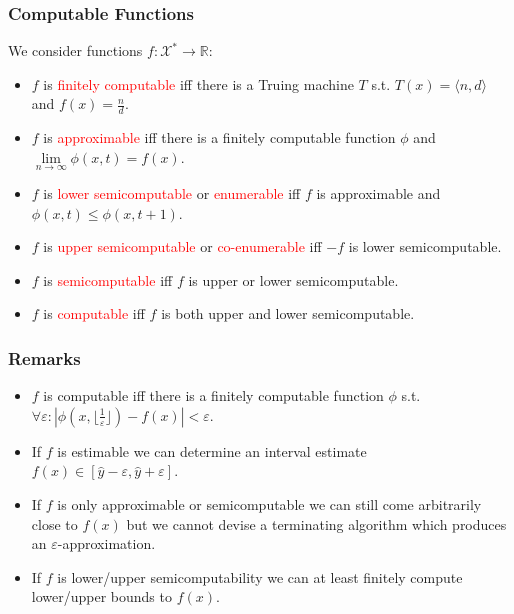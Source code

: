 \documentclass[UTF8,11pt,colorlinks,compress,openany]{beamer}%
\begin{document}
\begin{frame}\frametitle{Computable Functions}
We consider functions $f:\mathcal{X}^*\to\mathbb{R}$:
\begin{itemize}
	\item $f$ is \textcolor{red}{finitely computable} iff there is a Truing machine $T$ s.t. $T(x)=\langle n,d\rangle$ and $f(x)=\frac{n}{d}$.
	\item $f$ is \textcolor{red}{approximable} iff there is a finitely computable function $\phi$ and $\lim\limits_{n\to\infty}\phi(x,t)=f(x)$.
	\item $f$ is \textcolor{red}{lower semicomputable} or \textcolor{red}{enumerable} iff $f$ is approximable and $\phi(x,t)\leq \phi(x,t+1)$.
	\item $f$ is \textcolor{red}{upper semicomputable} or \textcolor{red}{co-enumerable} iff $-f$ is lower semicomputable.
	\item $f$ is \textcolor{red}{semicomputable} iff $f$ is upper or lower semicomputable.
	\item $f$ is \textcolor{red}{computable} iff $f$ is both upper and lower semicomputable.
\end{itemize}
\end{frame}

\begin{frame}\frametitle{Remarks}
\begin{itemize}
	\item $f$ is computable iff there is a finitely computable function $\phi$ s.t. $\forall\varepsilon:\left|\phi(x,\lfloor\frac{1}{\varepsilon}\rfloor)-f(x)\right|<\varepsilon$.
	\item If $f$ is estimable we can determine an interval estimate $f(x)\in[\hat{y}-\varepsilon,\hat{y}+\varepsilon]$.
	\item If $f$ is only approximable or semicomputable we can still come arbitrarily close to $f(x)$ but we cannot devise a terminating algorithm which produces an $\varepsilon$-approximation.
	\item If $f$ is lower/upper semicomputability we can at least finitely compute lower/upper bounds to $f(x)$.
\end{itemize}	
\end{frame}
\end{document}
